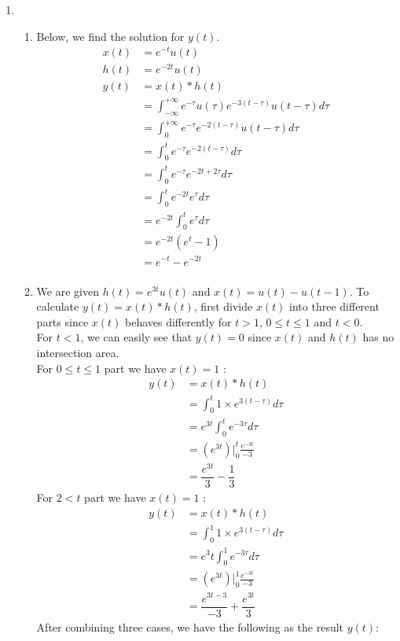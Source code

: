 \documentclass[10pt,a4paper, margin=1in]{article}
\begin{document}
\begin{enumerate}
\item %
    \begin{enumerate}
        \item Below, we find the solution for $y(t)$.
    	\begin{equation}
	\begin{split}
		x(t) & = e^{-t}u(t)\\
		h(t) & = e^{-2t}u(t)\\
		y(t) & = x(t) \ast h(t)\\
		& = \int_{-\infty}^{+\infty} e^{-\tau}u(\tau)e^{-3(t - \tau)}u(t - \tau)d\tau\\
		& = \int_{0}^{+\infty} e^{-\tau}e^{-2(t - \tau)}u(t - \tau)d\tau\\
		& = \int_{0}^{t} e^{-\tau}e^{-2(t - \tau)}d\tau\\
		& = \int_{0}^{t} e^{-\tau}e^{-2t + 2\tau}d\tau\\
		& = \int_{0}^{t} e^{-2t}e^{\tau}d\tau\\
		& = e^{-2t} \int_{0}^{t} e^{\tau}d\tau\\
		& = e^{-2t} \left( e^{t} -1 \right)\\
		& = e^{-t} - e^{-2t} \\ 
	\end{split}
	\end{equation}
    \item %
        We are given $h(t) = e^{3t}u(t)$ and $x(t)=u(t)-u(t-1)$. To calculate $y(t)=x(t)*h(t)$, first divide $x(t)$ into three different parts since $x(t)$  behaves differently for $t>1$, $0\leq t \leq 1$ and $t<0$. \\
    
    For $t<1$, we can easily see that $y(t)=0$ since $x(t)$ and $h(t)$ has no intersection area. \\
    
    For $0 \leq t \leq 1$ part we have $x(t) = 1$ : 
    \begin{align*}
        y(t) &= x(t)*h(t) \\
        &= \int_0^t 1 \times e^{3(t - \tau)}d\tau \\
        &= e^{3t} \int_0^t e^{-3 \tau}d\tau \\
        &= (e^{3t})\biggr\rvert_0^t \frac{e^{-3t}}{-3} \\
        &= \dfrac{e^{3t}}{3} - \dfrac{1}{3} 
    \end{align*}
    For $2 < t$ part we have $x(t) = 1$ : 
    \begin{align*}
        y(t) &= x(t)*h(t) \\
        &= \int_0^1 1 \times e^{3(t - \tau)}d\tau \\
        &= e^3t \int_0^1 e^{-3 \tau}d\tau \\
        &= (e^{3t})\biggr\rvert_0^1 \frac{e^{-3t}}{-3} \\
        &=  \dfrac{e^{3t-3}}{-3} + \dfrac{e^{3t}}{3}
    \end{align*}
	After combining three cases, we have the following as the result  $y(t)$:


\end{enumerate}
\end{enumerate}
\end{document}
